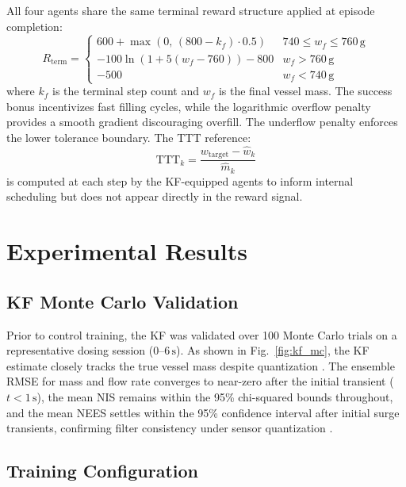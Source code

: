 \documentclass[conference]{IEEEtran}
\begin{document}
All four agents share the same terminal reward 
structure applied at episode completion:
\begin{equation}
    R_\text{term} = \begin{cases}
        600 + \max(0,\,(800-k_f)\cdot 0.5) & 
        740 \leq w_f \leq 760\,\text{g} \\[2pt]
        -100\ln(1 + 5(w_f - 760)) - 800 & 
        w_f > 760\,\text{g} \\[2pt]
        -500 & w_f < 740\,\text{g}
    \end{cases}
\end{equation}
where $k_f$ is the terminal step count and $w_f$ 
is the final vessel mass. The success bonus 
incentivizes fast filling cycles, while the 
logarithmic overflow penalty provides a smooth 
gradient discouraging overfill. The underflow 
penalty enforces the lower tolerance boundary. 
The TTT reference:
\begin{equation}
    \text{TTT}_k = \frac{w_\text{target} - 
    \hat{w}_k}{\hat{m}_k}
\end{equation}
is computed at each step by the KF-equipped agents 
to inform internal scheduling but does not appear 
directly in the reward signal.

\section{Experimental Results}
\label{sec:results}

\subsection{KF Monte Carlo Validation}

Prior to control training, the KF was validated over
100 Monte Carlo trials on a representative dosing
session ($0$--$6\,\text{s}$). As shown in
Fig.~\ref{fig:kf_mc}, the KF estimate closely tracks
the true vessel mass despite quantization
\cite{simon2006}. The ensemble RMSE for mass and flow
rate converges to near-zero after the initial transient
($t < 1\,\text{s}$), the mean NIS remains within the
95\% chi-squared bounds throughout, and the mean NEES
settles within the 95\% confidence interval after
initial surge transients, confirming filter consistency
under sensor quantization \cite{simon2006}.

\subsection{Training Configuration}
\end{document}
